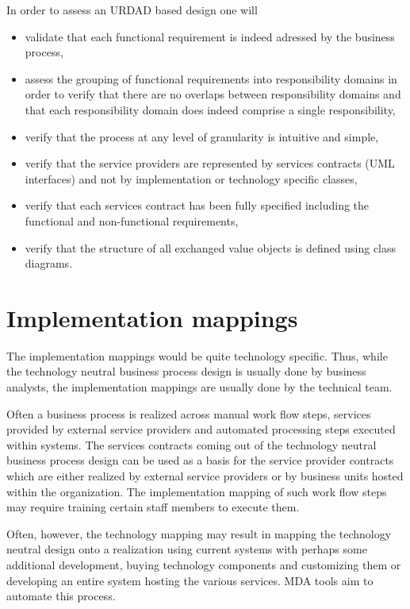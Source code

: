 \documentclass{IOS-Book-Article}
\begin{document}
In order to assess an URDAD based design one will
\begin{itemize}
   \item validate that each functional requirement is indeed adressed by the business process,
   \item assess the grouping of functional requirements into responsibility domains in
             order to verify that there are no overlaps between responsibility domains and that
             each responsibility domain does indeed comprise a single responsibility,
    \item  verify that the process at any level of granularity is intuitive and simple,
    \item verify that the service providers are represented by services contracts (UML interfaces) and 
              not by implementation or technology specific classes,
    \item verify that each services contract has been fully specified including the functional and
              non-functional requirements,
    \item verify that the structure of all exchanged value objects is defined using class diagrams.
\end{itemize}    


\section{Implementation mappings}

The implementation mappings would be quite technology specific. Thus, while the technology neutral business process design
is usually done by business analysts, the implementation mappings are usually done by the technical team. 

Often a business process is realized across manual work flow steps, services provided by external service providers
and automated processing steps executed within systems. The services contracts coming out of the technology
neutral business process design can be used as a basis for the service provider contracts which are either realized
by external service providers or by business units hosted within the organization. The implementation mapping of
such work flow steps may require training certain staff members to execute them.

Often, however, the technology mapping may result in mapping the technology neutral design onto a realization using
current systems with perhaps some additional development, buying technology components and customizing them or 
developing an entire system hosting the various services. MDA tools aim to automate this process.
\end{document}
